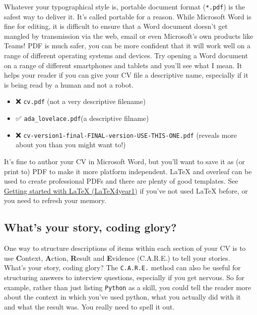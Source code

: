 \documentclass[
]{book}
\providecommand{\tightlist}{%
  \setlength{\itemsep}{0pt}\setlength{\parskip}{0pt}}
\begin{document}
Whatever your typographical style is, portable document format (\texttt{*.pdf}) is the safest way to deliver it. It's called portable for a reason. While Microsoft Word is fine for editing, it is difficult to ensure that a Word document doesn't get mangled by transmission via the web, email or even Microsoft's own products like Teams! PDF is much safer, you can be more confident that it will work well on a range of different operating systems and devices. Try opening a Word document on a range of different smartphones and tablets and you'll see what I mean. It helps your reader if you can give your CV file a descriptive name, especially if it is being read by a human and not a robot. 🤖

\begin{itemize}
\tightlist
\item
  ❌ \texttt{cv.pdf} (not a very descriptive filename)
\item
  ✅ \texttt{ada\_lovelace.pdf}(a descriptive filname)
\item
  ❌ \texttt{cv-version1-final-FINAL-version-USE-THIS-ONE.pdf} (reveals more about you than you might want to!)
\end{itemize}

It's fine to author your CV in Microsoft Word, but you'll want to save it as (or print to) PDF to make it more platform independent. LaTeX and overleaf can be used to create professional PDFs and there are plenty of good templates. See \href{https://latex4year1.netlify.app/}{Getting started with LaTeX (LaTeX4year1)} if you've not used LaTeX before, or you need to refresh your memory. \citep{latex4year1}

\hypertarget{care}{%
\subsection{What's your story, coding glory?}\label{care}}

One way to structure descriptions of items within each section of your CV is to use \textbf{C}ontext, \textbf{A}ction, \textbf{R}esult and \textbf{E}vidence (C.A.R.E.) to tell your stories. What's your story, coding glory? \citep{whatsthestory} The \texttt{C.A.R.E.} method can also be useful for structuring answers to interview questions, especially if you get nervous. So for example, rather than just listing \texttt{Python} as a skill, you could tell the reader more about the context in which you've used python, what you actually did with it and what the result was. You really need to spell it out.
\end{document}

